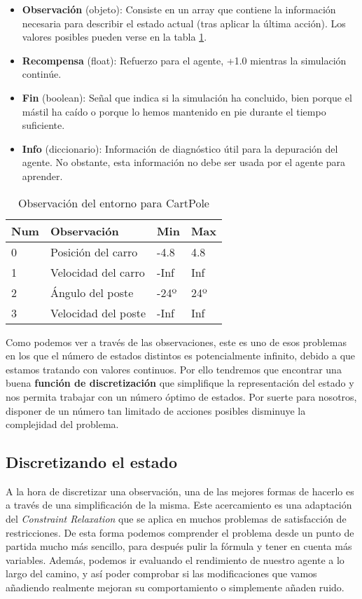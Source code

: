 \begin{itemize}
    \item \textbf{Observación} (objeto): Consiste en un array que contiene la información necesaria para describir el estado actual (tras aplicar la última acción). Los valores posibles pueden verse en la tabla \ref{obs-cartpole}.
    \item \textbf{Recompensa} (float): Refuerzo para el agente, +1.0 mientras la simulación continúe.
    \item \textbf{Fin} (boolean): Señal que indica si la simulación ha concluido, bien porque el mástil ha caído o porque lo hemos mantenido en pie durante el tiempo suficiente.
    \item \textbf{Info} (diccionario): Información de diagnóstico útil para la depuración del agente. No obstante, esta información no debe ser usada por el agente para aprender.
\end{itemize}
\begin{table}[]
    \centering
    \begin{tabular}{|l|l|l|l|}
    \hline
    \textbf{Num} & \textbf{Observación} & \textbf{Min} & \textbf{Max} \\ \hline
    0            & Posición del carro   & -4.8         & 4.8          \\ \hline
    1            & Velocidad del carro  & -Inf         & Inf          \\ \hline
    2            & Ángulo del poste     & -24º         & 24º          \\ \hline
    3            & Velocidad del poste  & -Inf         & Inf          \\ \hline
    \end{tabular}
    \caption{Observación del entorno para CartPole}
    \label{obs-cartpole}
\end{table}

Como podemos ver a través de las observaciones, este es uno de esos problemas en los que el número de estados distintos es potencialmente infinito, debido a que estamos tratando con valores continuos. Por ello tendremos que encontrar una buena \textbf{función de discretización} que simplifique la representación del estado y nos permita trabajar con un número óptimo de estados. Por suerte para nosotros, disponer de un número tan limitado de acciones posibles disminuye la complejidad del problema.

\subsection{Discretizando el estado}
A la hora de discretizar una observación, una de las mejores formas de hacerlo es a través de una simplificación de la misma. Este acercamiento es una adaptación del \textit{Constraint Relaxation} que se aplica en muchos problemas de satisfacción de restricciones. De esta forma podemos comprender el problema desde un punto de partida mucho más sencillo, para después pulir la fórmula y tener en cuenta más variables. Además, podemos ir evaluando el rendimiento de nuestro agente a lo largo del camino, y así poder comprobar si las modificaciones que vamos añadiendo realmente mejoran su comportamiento o simplemente añaden ruido.

